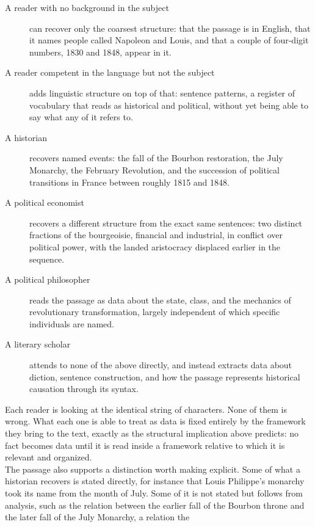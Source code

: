 \begin{description}
  \item[A reader with no background in the subject] can recover only the
        coarsest structure: that the passage is in English, that it names
        people called Napoleon and Louis, and that a couple of four-digit
        numbers, 1830 and 1848, appear in it.
  \item[A reader competent in the language but not the subject] adds
        linguistic structure on top of that: sentence patterns, a register of
        vocabulary that reads as historical and political, without yet being
        able to say what any of it refers to.
  \item[A historian] recovers named events: the fall of the Bourbon
        restoration, the July Monarchy, the February Revolution, and the
        succession of political transitions in France between roughly 1815
        and 1848.
  \item[A political economist] recovers a different structure from the exact
        same sentences: two distinct fractions of the bourgeoisie, financial
        and industrial, in conflict over political power, with the landed
        aristocracy displaced earlier in the sequence.
  \item[A political philosopher] reads the passage as data about the state,
        class, and the mechanics of revolutionary transformation, largely
        independent of which specific individuals are named.
  \item[A literary scholar] attends to none of the above directly, and
        instead extracts data about diction, sentence construction, and how
        the passage represents historical causation through its syntax.
\end{description}
Each reader is looking at the identical string of characters. None of them is
wrong. What each one is able to treat as data is fixed entirely by the
framework they bring to the text, exactly as the structural implication above
predicts: no fact becomes data until it is read inside a framework relative
to which it is relevant and organized.\\
The passage also supports a distinction worth making explicit. Some of what a
historian recovers is stated directly, for instance that Louis Philippe's
monarchy took its name from the month of July. Some of it is not stated but
follows from analysis, such as the relation between the earlier fall of the
Bourbon throne and the later fall of the July Monarchy, a relation the
